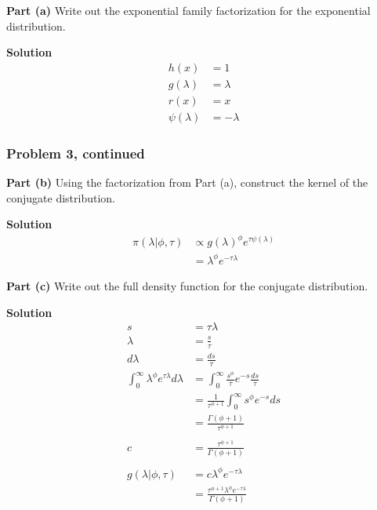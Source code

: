 \documentclass[12pt]{article}
\theoremstyle{definition}
\begin{document}
\noindent
{\bf Part (a)} Write out the exponential family factorization for the exponential distribution.

\bigskip
\noindent
{\bf Solution}
\begin{align*}
h(x) &= 1\\
g(\lambda) &= \lambda\\
r(x) &= x\\
\psi(\lambda) &= -\lambda
\end{align*}


\newpage
\subsubsection*{Problem 3, continued}

\noindent
{\bf Part (b)} Using the factorization from Part (a), construct the kernel of the conjugate distribution.

\bigskip
\noindent
{\bf Solution}
\begin{align*}
\pi(\lambda|\phi, \tau) &\propto g(\lambda)^\phi e^{\tau \psi(\lambda)}\\
&= \lambda^\phi e^{-\tau\lambda}
\end{align*}



\vspace{0.5in}
\noindent
{\bf Part (c)} Write out the full density function for the conjugate distribution.

\bigskip
\noindent
{\bf Solution}
\begin{align*}
s &= \tau\lambda\\
\lambda &= \frac{s}{\tau}\\
d\lambda &= \frac{ds}{\tau}\\
\int_0^\infty \lambda^\phi e^{\tau\lambda} d\lambda &= \int_0^\infty \frac{s^\phi}{\tau} e^{-s}\frac{ds}{\tau}\\
&= \frac{1}{\tau^{\phi + 1}} \int_0^\infty s^\phi e^{-s}ds\\
&= \frac{\Gamma(\phi + 1)}{\tau^{\phi + 1}}\\\\
c &= \frac{\tau^{\phi + 1}}{\Gamma(\phi + 1)}\\\\
g(\lambda|\phi,\tau) &= c\lambda^\phi e^{-\tau \lambda}\\
&= \frac{\tau^{\phi + 1}\lambda^\phi e^{-\tau\lambda}}{\Gamma(\phi + 1)}
\end{align*}




\newpage
\end{document}

